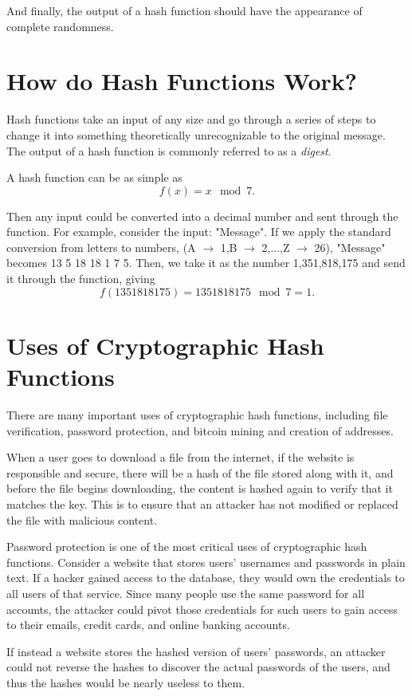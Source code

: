 \documentclass{article}
\begin{document}
And finally, the output of a hash function should have the appearance of complete randomness.

\section{How do Hash Functions Work?}
Hash functions take an input of any size and go through a series of steps to change it into something theoretically unrecognizable to the original message.
The output of a hash function is commonly referred to as a \textit{digest}.

A hash function can be as simple as $$f(x) = x\mod7.$$
		
Then any input could be converted into a decimal number and sent through the function. For example, consider the input: "Message". If we apply the standard conversion from letters to numbers, (A $\rightarrow$ 1,B $\rightarrow$ 2,...,Z $\rightarrow$ 26), "Message" becomes 13 5 18 18 1 7 5. Then, we take it as the number 1,351,818,175 and send it through the function, giving $$f(1351818175) = 1351818175 \mod 7 = 1.$$

\section{Uses of Cryptographic Hash Functions}
\tab There are many important uses of cryptographic hash functions, including file verification, password protection, and bitcoin mining and creation of addresses.

When a user goes to download a file from the internet, if the website is responsible and secure, there will be a hash of the file stored along with it, and before the file begins downloading, the content is hashed again to verify that it matches the key. This is to ensure that an attacker has not modified or replaced the file with malicious content.

Password protection is one of the most critical uses of cryptographic hash functions. Consider a website that stores users' usernames and passwords in plain text. If a hacker gained access to the database, they would own the credentials to all users of that service. Since many people use the same password for all accounts, the attacker could pivot those credentials for such users to gain access to their emails, credit cards, and online banking accounts. 

If instead a website stores the hashed version of users' passwords, an attacker could not reverse the hashes to discover the actual passwords of the users, and thus the hashes would be nearly useless to them.
\end{document}
